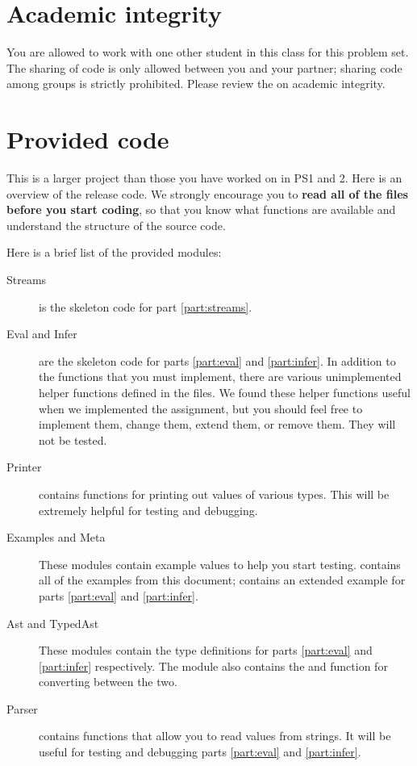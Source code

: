 \documentclass{pset}
\begin{document}
\section*{Academic integrity}

You are allowed to work with one other student in this class for this
problem set. The sharing of code is only allowed between you and your partner;
sharing code among groups is strictly prohibited. Please review the
 on academic integrity.


\section*{Provided code}

This is a larger project than those you have worked on in PS1 and 2.  Here is
an overview of the release code.  We strongly encourage you to \textbf{read all
of the  files before you start coding}, so that you know what
functions are available and understand the structure of the source code.

Here is a brief list of the provided modules:
\begin{description}
\item[Streams] is the skeleton code for part \ref{part:streams}.
\item[Eval and Infer]  are the skeleton code for parts \ref{part:eval} and \ref{part:infer}.
  In addition to the functions that you must implement, there are various
  unimplemented helper functions defined in the  files.  We found
  these helper functions useful when we implemented the assignment, but you
  should feel free to implement them, change them, extend them, or remove them.
  They will not be tested.
\item[Printer] contains functions for printing out values of various
  types.  This will be extremely helpful for testing and debugging.
\item[Examples and Meta] These modules contain example values to help you start
  testing.   contains all of the examples from this document;
   contains an extended example for parts \ref{part:eval} and \ref{part:infer}.
\item[Ast and TypedAst] These modules contain the type definitions for parts \ref{part:eval}
  and \ref{part:infer} respectively.  The  module also contains the
   and  function for converting between the two.
\item[Parser] contains  functions that allow you to read values from
  strings.  It will be useful for testing and debugging parts \ref{part:eval} and \ref{part:infer}.
\end{description}
\end{document}
